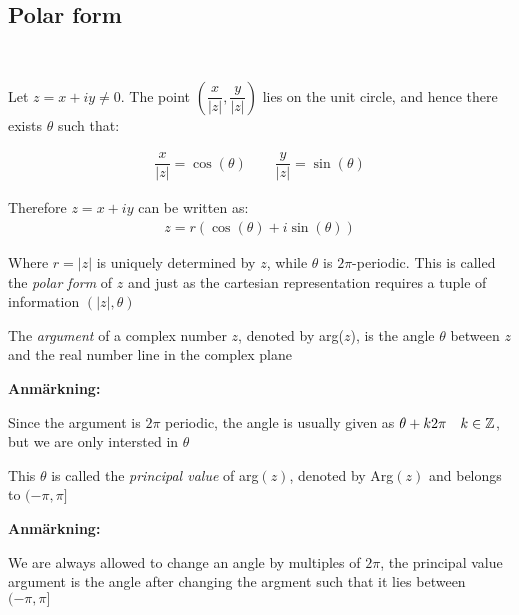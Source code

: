 \subsection{Polar form}\hfill\\\par
\noindent Let $z = x+iy\neq0$. The point $\left(\dfrac{x}{\left|z\right|}, \dfrac{y}{\left|z\right|}\right)$ lies on the unit circle, and hence there exists $\theta$ such that:
\par\bigskip
\begin{equation*}
  \begin{gathered}
    \dfrac{x}{\left|z\right|} = \cos(\theta)\qquad \dfrac{y}{\left|z\right|} = \sin(\theta)
  \end{gathered}
\end{equation*}
\par\bigskip
\noindent Therefore $z = x+iy$ can be written as:
\begin{equation*}
  \begin{gathered}
    z = r(\cos(\theta)+i\sin(\theta))
  \end{gathered}
\end{equation*}\par
\noindent Where $r = \left|z\right|$ is uniquely determined by $z$, while $\theta$ is $2\pi$-periodic.
\noindent This is called the \textit{polar form} of $z$ and just as the cartesian representation requires a tuple of information $(\left|z\right|,\theta)$
\par\bigskip
\begin{theo}[Argument]{}
  The \textit{argument} of a complex number $z$, denoted by arg($z$), is the angle $\theta$ between $z$ and the real number line in the complex plane
\end{theo}
\par\bigskip
\noindent\textbf{Anmärkning:}\par
\noindent Since the argument is $2\pi$ periodic, the angle is usually given as $\theta+k2\pi\quad k\in\mathbb{Z}$, but we are only intersted in $\theta$\par
\noindent This $\theta$ is called the \textit{principal value} of arg$(z)$, denoted by Arg$(z)$ and belongs to $(-\pi,\pi]$
\par\bigskip
\noindent\textbf{Anmärkning:}\par
\noindent We are always allowed to change an angle by multiples of $2\pi$, the principal value argument is the angle after changing the argment such that it lies between $(-\pi,\pi]$
\par\bigskip
